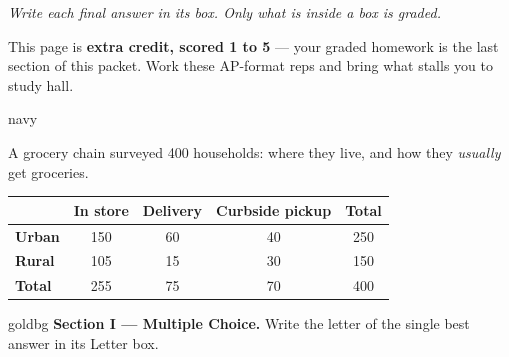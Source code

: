 \documentclass[12pt]{article}
\begin{document}
{\small\itshape Write each final answer in its box. Only what is inside a box is graded.}\par

\vspace{0.04in}

\boxguard[8]
\begin{remindbox}
\small
This page is \textbf{extra credit, scored 1 to 5} --- your graded homework is the last section
of this packet. Work these AP-format reps and bring what stalls you to study hall.
\end{remindbox}

\vspace{0.05in}

\boxguard[20]
\begin{scenariobox}{navy}
\small
\begin{minipage}[c]{0.30\linewidth}\raggedright
A grocery chain surveyed 400 households: where they live, and how they \emph{usually} get
groceries.
\end{minipage}\hfill
\begin{minipage}[c]{0.68\linewidth}
\centering
\renewcommand{\arraystretch}{1.1}
\begin{tabular}{@{} l | c c c | c @{}}
 & \textbf{In store} & \textbf{Delivery} & \textbf{Curbside pickup} & \textbf{Total} \\ \hline
\textbf{Urban} & 150 & 60 & 40 & 250 \\
\textbf{Rural} & 105 & 15 & 30 & 150 \\ \hline
\textbf{Total} & 255 & 75 & 70 & 400 \\
\end{tabular}
\end{minipage}
\end{scenariobox}

\vspace{0.05in}

\boxguard[12]
\begin{headlinebox}{goldbg}
\small
\textbf{Section I --- Multiple Choice.} Write the letter of the single best answer in its Letter box.
\end{headlinebox}

\vspace{0.04in}
\end{document}

